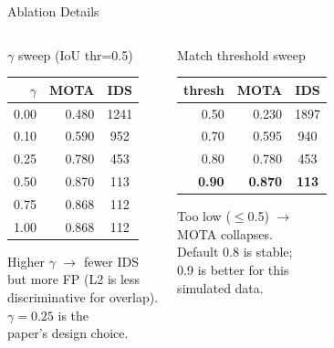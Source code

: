 \documentclass[aspectratio=169, 10pt]{beamer}
\newcommand{\best}[1]{\textbf{\textcolor{green!50!black}{#1}}}
\begin{document}
\begin{frame}{Ablation Details}

  \begin{columns}[T]

    \begin{block}{$\gamma$ sweep (IoU thr=0.5)}
      \vspace{0.3em}
      \small
      \begin{tabular}{rrc}
        \toprule
        $\gamma$ & MOTA & IDS \\
        \midrule
        0.00 & 0.480 & 1241 \\
        0.10 & 0.590 & 952 \\
        0.25 & 0.780 & 453 \\
        0.50 & 0.870 & 113 \\
        0.75 & 0.868 & 112 \\
        1.00 & 0.868 & 112 \\
        \bottomrule
      \end{tabular}
      \vspace{0.3em}

      Higher $\gamma$ $\to$ fewer IDS\\
      but more FP (L2 is less\\
      discriminative for overlap).\\
      $\gamma{=}0.25$ is the\\
      paper's design choice.
    \end{block}

    \begin{block}{Match threshold sweep}
      \vspace{0.3em}
      \small
      \begin{tabular}{rrc}
        \toprule
        thresh & MOTA & IDS \\
        \midrule
        0.50 & 0.230 & 1897 \\
        0.70 & 0.595 & 940 \\
        0.80 & 0.780 & 453 \\
        \best{0.90} & \best{0.870} & \best{113} \\
        \bottomrule
      \end{tabular}
      \vspace{0.3em}

      Too low ($\le$0.5) $\to$\\
      MOTA collapses.\\
      Default 0.8 is stable;\\
      0.9 is better for this\\
      simulated data.
    \end{block}


\end{columns}
\end{frame}
\end{document}
